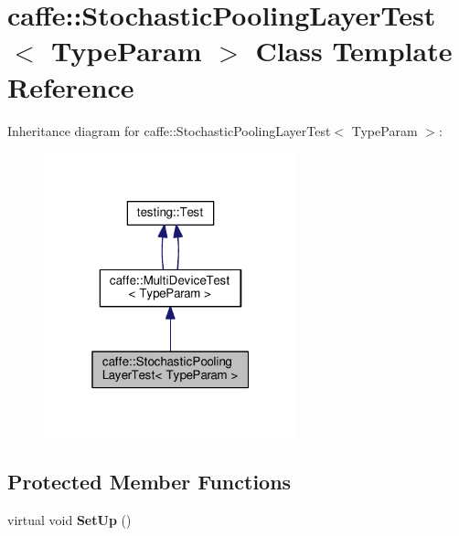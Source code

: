 \hypertarget{classcaffe_1_1_stochastic_pooling_layer_test}{}\section{caffe\+:\+:Stochastic\+Pooling\+Layer\+Test$<$ Type\+Param $>$ Class Template Reference}
\label{classcaffe_1_1_stochastic_pooling_layer_test}


Inheritance diagram for caffe\+:\+:Stochastic\+Pooling\+Layer\+Test$<$ Type\+Param $>$\+:
\nopagebreak
\begin{figure}[H]
\begin{center}
\leavevmode
\includegraphics[width=208pt]{classcaffe_1_1_stochastic_pooling_layer_test__inherit__graph}
\end{center}
\end{figure}
\subsection*{Protected Member Functions}
\begin{DoxyCompactItemize}
\item 
\mbox{\label{classcaffe_1_1_stochastic_pooling_layer_test_ad5eb30b8ff06b691e89d38a5a39c654b}} 
virtual void {\bfseries Set\+Up} ()
\end{DoxyCompactItemize}
